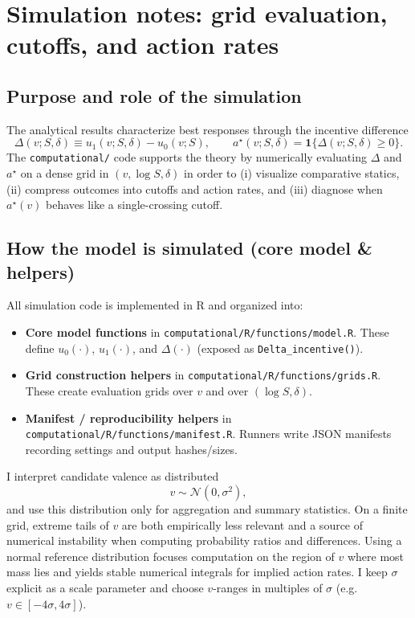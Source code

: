 \section{Simulation notes: grid evaluation, cutoffs, and action rates}\label{sec:sim_notes}

\subsection{Purpose and role of the simulation}\label{subsec:sim_purpose}

The analytical results characterize best responses through the incentive difference
\[
    \Delta(v;S,\delta) \equiv u_1(v;S,\delta) - u_0(v;S),
    \qquad
    a^\star(v;S,\delta)=\mathbf{1}\{\Delta(v;S,\delta)\ge 0\}.
\]
The \texttt{computational/} code supports the theory by numerically evaluating $\Delta$ and $a^\star$ on a dense
grid in $(v,\log S,\delta)$ in order to (i) visualize comparative statics, (ii) compress outcomes into cutoffs and
action rates, and (iii) diagnose when $a^\star(v)$ behaves like a single-crossing cutoff.

\subsection{How the model is simulated (core model \& helpers)}\label{subsec:sim_how}

All simulation code is implemented in R and organized into:
\begin{itemize}
    \item \textbf{Core model functions} in \texttt{computational/R/functions/model.R}. These define $u_0(\cdot)$,
    $u_1(\cdot)$, and $\Delta(\cdot)$ (exposed as \texttt{Delta\_incentive()}).
    \item \textbf{Grid construction helpers} in \texttt{computational/R/functions/grids.R}. These create evaluation
    grids over $v$ and over $(\log S,\delta)$.
    \item \textbf{Manifest / reproducibility helpers} in \texttt{computational/R/functions/manifest.R}. Runners write
    JSON manifests recording settings and output hashes/sizes.
\end{itemize}

I interpret candidate valence as distributed
\[
    v \sim \mathcal{N}(0,\sigma^2),
\]
and use this distribution only for aggregation and summary statistics. On a finite grid, extreme tails of $v$ are
both empirically less relevant and a source of numerical instability when computing probability ratios and
differences. Using a normal reference distribution focuses computation on the region of $v$ where most mass lies and
yields stable numerical integrals for implied action rates. I keep $\sigma$ explicit as a scale parameter and choose
$v$-ranges in multiples of $\sigma$ (e.g.\ $v\in[-4\sigma,4\sigma]$).


